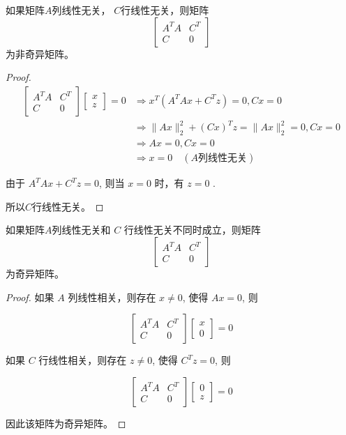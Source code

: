 \begin{theorem}
    如果矩阵$A$列线性无关， $C$行线性无关，则矩阵
$$
\left[\begin{array}{cc}
A^{T} A & C^{T} \\
{C} & 0
\end{array}\right]
$$
为非奇异矩阵。  
\end{theorem}

\begin{proof}
    $$ \begin{aligned}\left[\begin{array}{cc}A^{T} A & C^{T} \\ {C} & 0\end{array}\right]\left[\begin{array}{c}x \\ z\end{array}\right]=0 & \Rightarrow x^{T}\left(A^{T} A x+C^{T} z\right)=0, C x=0 \\ & \Rightarrow\|A x\|_{2}^{2}+(C x)^{T} z=\|A x\|_{2}^{2}=0, C x=0 \\ & \Rightarrow A x=0, C x=0 \\ & \Rightarrow x=0 \quad (A\text {列线性无关}) \end{aligned} $$

    由于 $ A^{T} A x+C^{T} {z}=0 $, 则当 $ x=0 $ 时，有 $ {z}=0 $ . 
    
    所以$C$行线性无关。
\end{proof}

\begin{theorem}
    如果矩阵$A$列线性无关和 $ C $ 行线性无关不同时成立，则矩阵
$$
\left[\begin{array}{cc}
A^{T} A & C^{T} \\
{C} & 0
\end{array}\right]
$$
为奇异矩阵。
\end{theorem}

\begin{proof}
    如果 $ {A} $ 列线性相关，则存在 $ x \neq 0 $, 使得 $ A x=0 $, 则

    $$
    \left[\begin{array}{cc}
    A^{T} A & C^{T} \\
    {C} & 0
    \end{array}\right]\left[\begin{array}{l}
    x \\
    0
    \end{array}\right]=0
    $$

    如果 $ C $ 行线性相关，则存在 $ z \neq 0 $, 使得 $ C^{T} z=0 $, 则

    $$
    \left[\begin{array}{cc}
    A^{T} A & C^{T} \\
    {C} & 0
    \end{array}\right]\left[\begin{array}{l}
    0 \\
    {z}
    \end{array}\right]=0
    $$

    因此该矩阵为奇异矩阵。
\end{proof}



